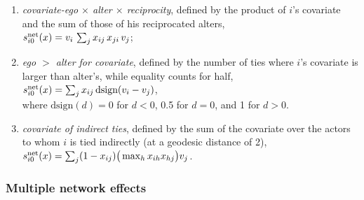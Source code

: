 \documentclass[a4paper,fleqn]{article}
\newcommand{\+}{\, + \,}
\newcommand{\vit}{\theenumi}
\newcommand{\SI}{{\sf SIENA }}
\newcounter{savenumi}
\begin{document}
{\begin{enumerate}
 \item {\em covariate-ego $\times$ alter $\times$ reciprocity},
 defined by the product of $i$'s covariate and the sum of those of his reciprocated alters,\\
 $s^{\rm net}_{i\vit}(x) = v_i \, \sum_j x_{ij}\,x_{ji}\, v_j $;

 \item {\em ego $>$ alter for covariate},
 defined by the number of ties where $i$'s covariate
 is larger than alter's, while equality counts for half,\\
 $s^{\rm net}_{i\vit}(x) =  \sum_j x_{ij}\, \text{dsign}(v_i - v_j) $,\\
 where $\text{dsign}(d) = 0$ for $d < 0$, 0.5 for $d = 0$,
 and 1 for $d > 0$.

 \item {\em covariate of indirect ties}, defined by
 the sum of the covariate over the actors
 to whom $i$ is tied indirectly (at a geodesic distance of 2),\\
 $s^{\rm net}_{i\vit}(x) = \sum_j (1 -x_{ij})
                      \big( \max_h x_{ih}x_{hj} \big) v_j $.

\setcounter{savenumi}{\value{enumi}}
\end{enumerate}



\subsubsection{Multiple network effects}
\label{S_MultiNet}

}
\end{document}
